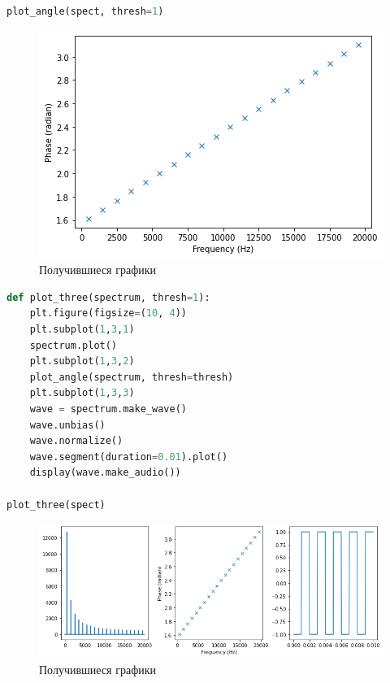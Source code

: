 \begin{lstlisting}[language=Python]
plot_angle(spect, thresh=1)
\end{lstlisting}

\begin{figure}[H]
	\begin{center}
		\includegraphics[scale=0.66]{fig/lab06/lab06_10.png}
		\caption{Получившиеся графики}
	\end{center}
\end{figure}


\begin{lstlisting}[language=Python]
def plot_three(spectrum, thresh=1):
    plt.figure(figsize=(10, 4))
    plt.subplot(1,3,1)
    spectrum.plot()
    plt.subplot(1,3,2)
    plot_angle(spectrum, thresh=thresh)
    plt.subplot(1,3,3)
    wave = spectrum.make_wave()
    wave.unbias()
    wave.normalize()
    wave.segment(duration=0.01).plot()
    display(wave.make_audio())
    
plot_three(spect)
\end{lstlisting}

\begin{figure}[H]
	\begin{center}
		\includegraphics[scale=0.66]{fig/lab06/lab06_11.png}
		\caption{Получившиеся графики}
	\end{center}
\end{figure}

